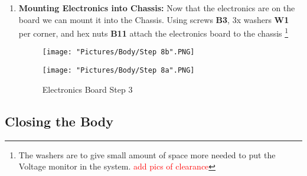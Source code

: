 \documentclass[12pt]{article}
\begin{document}
\begin{enumerate}
\item \textbf{Mounting Electronics into Chassis: } Now that the electronics are on the board we can mount it into the Chassis. Using screws \textbf{B3}, 3x washers \textbf{W1} per corner, and hex nuts \textbf{B11} attach the electronics board to the chassis \footnote{The washers are to give small amount of space more needed to put the Voltage monitor in the system. \textcolor{red}{add pics of clearance}}

\begin{figure}[H]
  \centering
  \begin{minipage}[b]{0.40\textwidth}
    \texttt{[image: "Pictures/Body/Step 8b".PNG]}
  \end{minipage}
  \hfill
  \begin{minipage}[b]{0.40\textwidth}
    \texttt{[image: "Pictures/Body/Step 8a".PNG]}
  \end{minipage}
  \caption{Electronics Board Step 3}
\end{figure}
\end{enumerate}

\subsection{Closing the Body}
\end{document}
